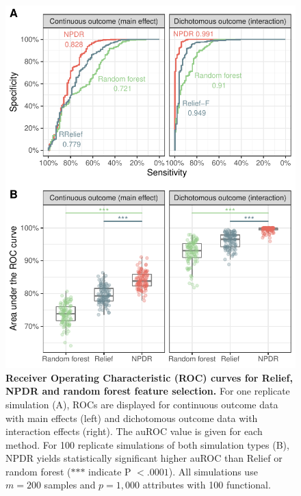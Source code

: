 \documentclass{article}
\begin{document}
\begin{figure}[h]%
\centerline{\includegraphics[]{../figs/roc_compare_100.pdf}}
\caption{\textbf{Receiver Operating Characteristic (ROC) curves for Relief, NPDR and random forest feature selection.} For one replicate simulation (A), ROCs are displayed for continuous outcome data with main effects (left) and dichotomous outcome data with interaction effects (right). The auROC value is given for each method. For 100 replicate simulations of both simulation types (B), NPDR yields statistically significant higher auROC than Relief or random forest ($\ast$$\ast$$\ast$ indicate P $<.0001$). All simulations use $m = 200$ samples and $p = 1,000$ attributes with 100 functional.}
\label{fig:auROC}
\end{figure}


\end{document}
